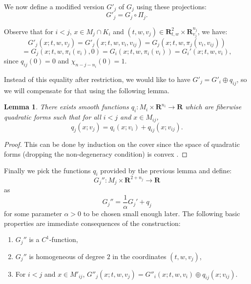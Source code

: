 \documentclass[reqno]{amsart}
\theoremstyle{theorem}
\newtheorem{lemma}[corollary]{Lemma}
\theoremstyle{remark}
\theoremstyle{definition}
\newcommand{\bR}{\mathbf{R}}
\newcommand{\R}{\mathbf{R}}
\begin{document}
We now define a modified version $G'_j$ of $G_j$ using these projections:
\[G'_j=G_j\circ\Pi_j.\]


Observe that for $i<j$, $x\in M_j \cap K_i$ and $(t,w,v_j)\in \R^2_{t,w} \times \R^{n_j}_{v_j}$, we have:
$$
G'_j(x;t,w,v_j)= G'_j(x;t,w,v_i,v_{ij})=G_j(x;t,w,\pi_j(v_i,v_{ij}))$$ $$ =G_j(x;t,w,\pi_i(v_i),0)=G_i(x;t,w,\pi_i(v_i))=G_i'(x;t,w,v_i),
$$
since $q_{ij}(0)=0$ and $\chi_{n-j-n_i}(0)=1$.

Instead of this equality after restriction, we would like to have $G'_j =G'_i \oplus q_{ij}$, so we will compensate for that using the following lemma.


\begin{lemma}
There exists smooth functions $q_i :M_i \times \R^{n_i}\to \R$ which are fiberwise quadratic forms such that
for all $i<j$ and $x\in M_{ij}$, 
\[q_j(x;v_j)=q_i(x;v_i)+q_{ij}(x;v_{ij}).\]
\end{lemma}
\begin{proof} This can be done by induction on the cover since the space of quadratic forms (dropping the non-degeneracy condition) is convex .
\end{proof}


Finally we pick the functions $q_i$ provided by the previous lemma and define:
\[G_j'':M_j\times \R^{2+n_j} \to \R\]
as
\[G_j''=\frac{1}{\alpha} G_j'+q_j\]
for some parameter $\alpha>0$ to be chosen small enough later. The following basic properties are immediate consequences of the construction:
\begin{enumerate}
\item $G_j''$ is a $C^1$-function,
\item $G_j''$ is homogeneous of degree $2$ in the coordinates $(t,w,v_j)$,
\item For $i<j$ and $x\in M'_{ij}$, $G''_j(x;t,w,v_j)=G''_i(x;t,w,v_i)\oplus  q_{ij}(x;v_{ij})$.
\end{enumerate}
\end{document}
